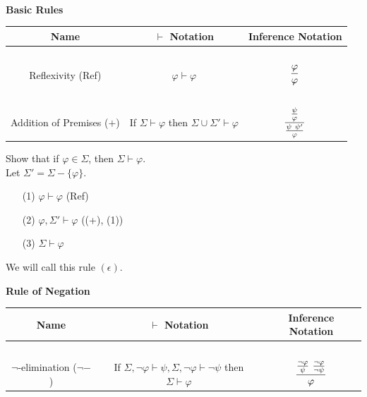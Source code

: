 \documentclass[english, 11pt]{article}
\begin{document}
  \begin{defn}\label{natural} \

    \begin{center}\textbf{Basic Rules}\end{center}

    \begin{center}
    \begin{tabular}{c | c | c }
      Name & $\vdash$ Notation & Inference Notation \\
      \hline
      \hline
      \ &&\\
      Reflexivity (Ref) & $\varphi \vdash \varphi$ & $\displaystyle\frac{\varphi}{\varphi}$ \\[3ex]
      \hline
      \hline
      \ &&\\
      Addition of Premises ($+$) & If $\Sigma \vdash \varphi$ then $\Sigma \cup \Sigma' \vdash \varphi$ & $\displaystyle\f{\f{\psi}{\varphi}}{\f{\psi \ \psi'}{\varphi}}$ \\[3ex]
      \hline
      \hline
    \end{tabular}
    \end{center}

    \begin{exmp}
      Show that if $\varphi \in \Sigma$, then $\Sigma \vdash \varphi$. \\

      Let $\Sigma' = \Sigma - \{ \varphi \}$.
      \begin{itemize}
        \item[(1)] $\varphi \vdash \varphi$ (Ref)
        \item[(2)] $\varphi, \Sigma' \vdash \varphi$ ((+), (1))
        \item[(3)] $\Sigma \vdash \varphi$
      \end{itemize}

      We will call this rule $(\epsilon)$.
    \end{exmp}

    \begin{center}\textbf{Rule of Negation}\end{center}

    \begin{center}
    \begin{tabular}{c | c | c }
      Name & $\vdash$ Notation & Inference Notation \\
      \hline
      \hline
      \ &&\\
      $\neg$-elimination ($\neg -$) & If $\Sigma, \neg \varphi \vdash \psi, \Sigma, \neg \varphi \vdash \neg \psi$ then $\Sigma \vdash \varphi$ & $\displaystyle\frac{\frac{\neg\varphi}{\psi} \ \frac{\neg \varphi}{\neg \psi}}{\varphi}$ \\[3ex]
      \hline
      \hline
    \end{tabular}
    \end{center}


\end{defn}
\end{document}
